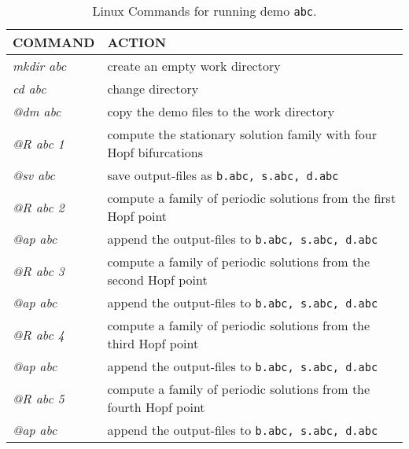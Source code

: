 \documentclass[12pt]{report}
\begin{document}
\begin{table}[htbp]
\begin{center}
\begin{tabular}{| l | l |}
\hline
  COMMAND  & ACTION \\ 
\hline
  {\it mkdir abc} & create an empty work directory \\ 
  {\it cd abc} & change directory \\
  {\it @dm abc} & copy the demo files to the work directory \\
\hline
  {\it @R abc 1} & compute the stationary solution family 
						with four Hopf bifurcations \\ 
  {\it @sv abc} & save output-files as {\tt b.abc, s.abc, d.abc} \\ 
\hline
  {\it @R abc 2} & compute a family of periodic solutions from the first Hopf point \\ 
  {\it @ap abc} & append the output-files to {\tt b.abc, s.abc, d.abc} \\ 
\hline
  {\it @R abc 3} & compute a family of periodic solutions from the second Hopf point \\ 
  {\it @ap abc} & append the output-files to {\tt b.abc, s.abc, d.abc} \\ 
\hline
  {\it @R abc 4} & compute a family of periodic solutions from the third Hopf point \\ 
  {\it @ap abc} & append the output-files to {\tt b.abc, s.abc, d.abc} \\ 
\hline
  {\it @R abc 5} & compute a family of periodic solutions from the fourth Hopf point \\ 
  {\it @ap abc} & append the output-files to {\tt b.abc, s.abc, d.abc} \\ 
\hline
\end{tabular}
\caption{Linux Commands for running demo {\tt abc}.}
\label{tbl:demo_abcL}
\end{center}
\end{table}
\end{document}
